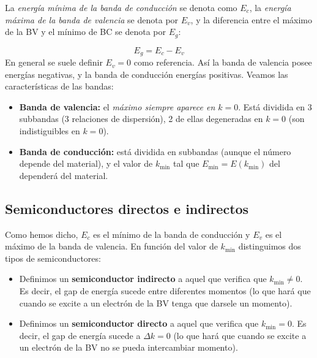 La \textit{energía mínima de la banda de conducción} se denota como $E_c$, la \textit{energía máxima de la banda de valencia} se denota por $E_v$, y la diferencia entre el máximo de la BV y el mínimo de BC se denota por $E_g$:

\begin{equation}
	E_g = E_c - E_v
\end{equation}
En general se suele definir $E_v=0$ como referencia. Así la banda de valencia posee energías negativas, y la banda de conducción energías positivas. Veamos las características de las bandas:

\begin{itemize}
	\item \textbf{Banda de valencia:} el \textit{máximo siempre aparece en $k=0$}. Está dividida en 3 subbandas (3 relaciones de dispersión), 2 de ellas degeneradas en $k=0$ (son indistiguibles en $k=0$). 
	\item \textbf{Banda de conducción:} está dividida en subbandas (aunque el número depende del material), y el valor de $k_{\min}$ tal que $E_{\min}=E(k_{\min})$ del dependerá del material. 
\end{itemize}


\subsection{Semiconductores directos e indirectos}

Como hemos dicho, $E_c$ es el mínimo de la banda de conducción y $E_v$ es el máximo de la banda de valencia. En función del valor de $k_{\min}$ distinguimos dos tipos de semiconductores:
\begin{itemize}
	\item Definimos un \textbf{semiconductor indirecto} a aquel que verifica que $k_{\min}\neq0$. Es decir, el gap de energía sucede entre diferentes momentos (lo que hará que cuando se excite a un electrón de la BV tenga que darsele un momento).
	\item Definimos un \textbf{semiconductor directo} a aquel que verifica que $k_{\min}=0$. Es decir, el gap de energía sucede a $\Delta k =0$ (lo que hará que cuando se excite a un electrón de la BV no se pueda intercambiar momento).
\end{itemize}


